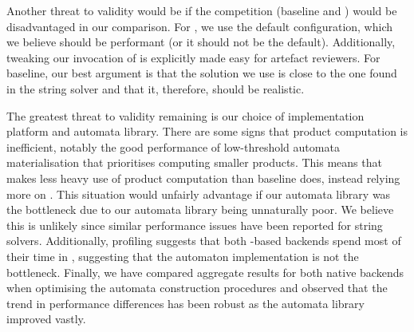 Another threat to validity would be if the competition (baseline and \Nuxmv)
would be disadvantaged in our comparison. For \Nuxmv{}, we use the default
configuration, which we believe should be performant (or it should not be the
default). Additionally, tweaking our invocation of \Nuxmv{} is explicitly made
easy for artefact reviewers. For baseline, our best argument is that the
solution we use is close to the one found in the \Ostrich{} string solver and
that it, therefore, should be realistic.

The greatest threat to validity remaining is our choice of implementation
platform and automata library. There are some signs that product computation
is inefficient, notably the good performance of low-threshold automata
materialisation that prioritises computing smaller products. This means that
\Calculus{} makes less heavy use of product computation than baseline does,
instead relying more on \Princess{}. This situation would unfairly advantage
\Calculus{} if our automata library was the bottleneck due to our automata
library being unnaturally poor. We believe this is unlikely since similar
performance issues have been reported for string solvers. Additionally,
profiling suggests that both \Princess{}-based backends spend most of their time
in \Princess{}, suggesting that the automaton implementation is not the
bottleneck. Finally, we have compared aggregate results for both native backends
when optimising the automata construction procedures and observed that the trend
in performance differences has been robust as the automata library improved
vastly.

